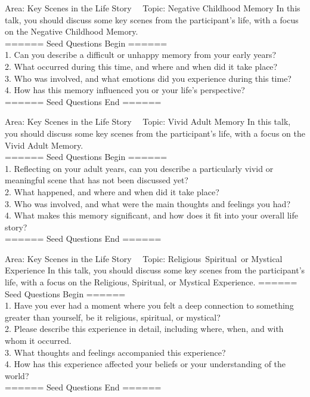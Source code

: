 \begin{mybox}{Area: Key Scenes in the Life Story \ \ Topic: Negative Childhood Memory}
In this talk, you should discuss some key scenes from the participant's life, with a focus on the Negative Childhood Memory. \\
====== Seed Questions Begin ====== \\
1. Can you describe a difficult or unhappy memory from your early years? \\
2. What occurred during this time, and where and when did it take place? \\
3. Who was involved, and what emotions did you experience during this time? \\
4. How has this memory influenced you or your life's perspective? \\
====== Seed Questions End ====== \\
\end{mybox}

\begin{mybox}{Area: Key Scenes in the Life Story \ \ Topic: Vivid Adult Memory}
In this talk, you should discuss some key scenes from the participant's life, with a focus on the Vivid Adult Memory. \\
====== Seed Questions Begin ====== \\
1. Reflecting on your adult years, can you describe a particularly vivid or meaningful scene that has not been discussed yet? \\
2. What happened, and where and when did it take place? \\
3. Who was involved, and what were the main thoughts and feelings you had? \\
4. What makes this memory significant, and how does it fit into your overall life story? \\
====== Seed Questions End ====== \\
\end{mybox}

\begin{mybox}{Area: Key Scenes in the Life Story \ \ Topic: Religious\, Spiritual\, or Mystical Experience}
In this talk, you should discuss some key scenes from the participant's life, with a focus on the Religious, Spiritual, or Mystical Experience.
====== Seed Questions Begin ====== \\
1. Have you ever had a moment where you felt a deep connection to something greater than yourself, be it religious, spiritual, or mystical? \\
2. Please describe this experience in detail, including where, when, and with whom it occurred. \\
3. What thoughts and feelings accompanied this experience? \\
4. How has this experience affected your beliefs or your understanding of the world? \\
====== Seed Questions End ====== \\
\end{mybox}

